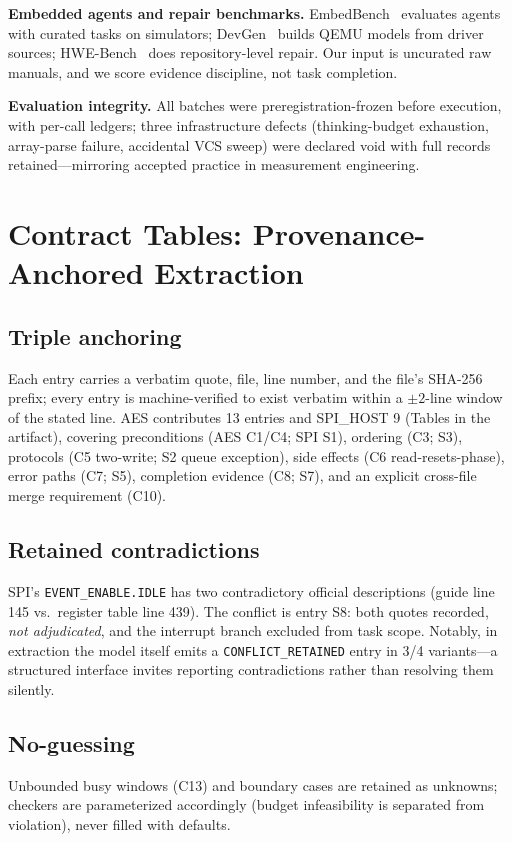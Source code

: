 \documentclass[conference]{IEEEtran}
\begin{document}
\textbf{Embedded agents and repair benchmarks.}
EmbedBench~\cite{embedbench} evaluates agents with curated tasks on
simulators; DevGen~\cite{devgen} builds QEMU models from driver sources;
HWE-Bench~\cite{hwebench} does repository-level repair. Our input is
uncurated raw manuals, and we score evidence discipline, not task
completion.

\textbf{Evaluation integrity.} All batches were preregistration-frozen
before execution, with per-call ledgers; three infrastructure defects
(thinking-budget exhaustion, array-parse failure, accidental VCS sweep)
were declared void with full records retained---mirroring accepted
practice in measurement engineering.

\section{Contract Tables: Provenance-Anchored Extraction}
\label{sec:contract}

\subsection{Triple anchoring}
Each entry carries a verbatim quote, file, line number, and the file's
SHA-256 prefix; every entry is machine-verified to exist verbatim within
a $\pm2$-line window of the stated line. AES contributes 13 entries and
SPI\_HOST 9 (Tables in the artifact), covering preconditions (AES
C1/C4; SPI S1), ordering (C3; S3), protocols (C5 two-write; S2
queue exception), side effects (C6 read-resets-phase), error paths
(C7; S5), completion evidence (C8; S7), and an explicit cross-file
merge requirement (C10).

\subsection{Retained contradictions}
SPI's \texttt{EVENT\_ENABLE.IDLE} has two contradictory official
descriptions (guide line 145 vs.\ register table line 439). The conflict
is entry S8: both quotes recorded, \emph{not adjudicated}, and the
interrupt branch excluded from task scope. Notably, in extraction the
model itself emits a \texttt{CONFLICT\_RETAINED} entry in 3/4
variants---a structured interface invites reporting contradictions
rather than resolving them silently.

\subsection{No-guessing}
Unbounded busy windows (C13) and boundary cases are retained as unknowns;
checkers are parameterized accordingly (budget infeasibility is separated
from violation), never filled with defaults.
\end{document}

